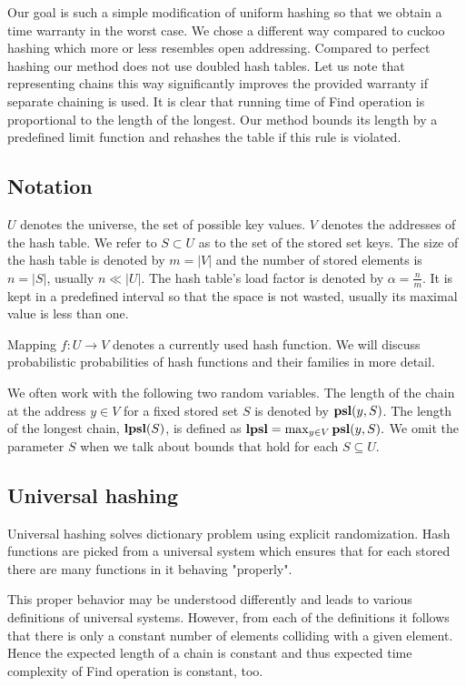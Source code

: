 Our goal is such a simple modification of uniform hashing so that we obtain a time warranty in the worst case. We chose a different way compared to cuckoo hashing which more or less resembles open addressing. Compared to perfect hashing our method does not use doubled hash tables. Let us note that representing chains this way significantly improves the provided warranty if separate chaining is used. It is clear that running time of Find operation is proportional to the length of the longest. Our method bounds its length by a predefined limit function and rehashes the table if this rule is violated.

\subsection{Notation}
$U$ denotes the universe, the set of possible key values. $V$ denotes the addresses of the hash table. We refer to $S \subset U$ as to the set of the stored set keys. The size of the hash table is denoted by $m = |V|$ and the number of stored elements is $n = |S|$, usually $n \ll |U|$. The hash table's load factor is denoted by $\alpha = \frac{n}{m}$. It is kept in a predefined interval so that the space is not wasted, usually its maximal value is less than one.

Mapping $f\colon U \rightarrow V$ denotes a currently used hash function. We will discuss probabilistic probabilities of hash functions and their families in more detail.

We often work with the following two random variables. The length of the chain at the address $y \in V$ for a fixed stored set $S$ is denoted by $\mathbf{psl}(y, S)$. The length of the longest chain, $\mathbf{lpsl}(S)$, is defined as $\mathbf{lpsl} = \max_{y \in V} \mathbf{psl}(y, S).$ We omit the parameter $S$ when we talk about bounds that hold for each $S \subseteq U$.

\subsection{Universal hashing}
Universal hashing solves dictionary problem using explicit randomization. Hash functions are picked from a universal system which ensures that for each stored there are many functions in it behaving "properly".

This proper behavior may be understood differently and leads to various definitions of universal systems. However, from each of the definitions it follows that there is only a constant number of elements colliding with a given element. Hence the expected length of a chain is constant and thus expected time complexity of Find operation is constant, too.

